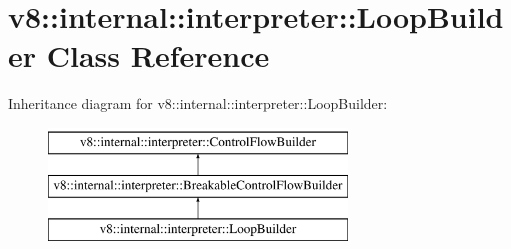 \hypertarget{classv8_1_1internal_1_1interpreter_1_1LoopBuilder}{}\section{v8\+:\+:internal\+:\+:interpreter\+:\+:Loop\+Builder Class Reference}
\label{classv8_1_1internal_1_1interpreter_1_1LoopBuilder}
Inheritance diagram for v8\+:\+:internal\+:\+:interpreter\+:\+:Loop\+Builder\+:\begin{figure}[H]
\begin{center}
\leavevmode
\includegraphics[height=3.000000cm]{classv8_1_1internal_1_1interpreter_1_1LoopBuilder}
\end{center}
\end{figure}
